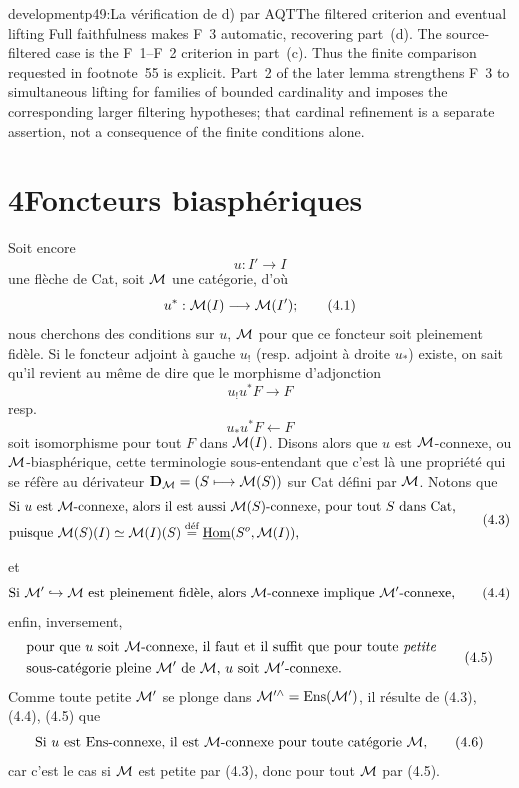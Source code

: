 \begin{dcomment}{development}{p49:La vérification de d) par AQT}{The filtered criterion and eventual lifting}
Full faithfulness makes F~3 automatic, recovering part~(d). The source-filtered case is the F~1--F~2 criterion in part~(c). Thus the finite comparison requested in footnote~55 is explicit. Part~2 of the later lemma strengthens F~3 to simultaneous lifting for families of bounded cardinality and imposes the corresponding larger filtering hypotheses; that cardinal refinement is a separate assertion, not a consequence of the finite conditions alone.
\end{dcomment}


\section*{4\quad Foncteurs biasphériques}

Soit encore
\[
u : I' \longrightarrow I
\]
une flèche de Cat, soit $\mathcal{M}$ une catégorie, d'où
\[
u^* : \cM(I) \longrightarrow \cM(I');
\tag*{(4.1)}
\]
nous cherchons des conditions sur $u$, $\mathcal{M}$ pour que ce foncteur soit pleinement fidèle. Si le foncteur adjoint à gauche $u_!$ (resp. adjoint à droite $u_*$) existe, on sait qu'il revient au même de dire que le morphisme d'adjonction
\[
u_!u^*F \longrightarrow F
\tag*{(4.2)}
\]
resp.
\[
u_*u^*F \longleftarrow F
\tag*{(4.2 bis)}
\]
soit isomorphisme pour tout $F$ dans $\mathcal{M}(I)$. Disons alors que $u$ est $\mathcal{M}$-connexe, ou $\mathcal{M}$-biasphérique, cette terminologie sous-entendant que c'est là une propriété qui se réfère au dérivateur $\mathbf{D}_{\mathcal{M}} = (S \longmapsto \mathcal{M}(S))$ sur Cat défini par $\mathcal{M}$. Notons que
\[
\begin{aligned}
&\text{Si $u$ est $\cM$-connexe, alors il est aussi $\cM(S)$-connexe, pour tout $S$ dans Cat,}\\
&\text{puisque $\cM(S)(I) \simeq \cM(I)(S) \defeq \uHom(S^o, \cM(I))$,}
\end{aligned}
\tag*{(4.3)}
\]

et
\[
\text{Si $\cM' \hookrightarrow \cM$ est pleinement fidèle, alors $\cM$-connexe implique $\cM'$-connexe,}
\tag*{(4.4)}
\]
enfin, inversement,
\[
\begin{aligned}
&\text{pour que $u$ soit $\cM$-connexe, il faut et il suffit que pour toute \textit{petite}}\\
&\text{sous-catégorie pleine $\cM'$ de $\cM$, $u$ soit $\cM'$-connexe.}
\end{aligned}
\tag*{(4.5)}
\]
Comme toute petite $\mathcal{M}'$ se plonge dans $\mathcal{M}'^\wedge = \operatorname{Ens}(\mathcal{M}')$, il résulte de (4.3), (4.4), (4.5) que
\[
\text{Si $u$ est Ens-connexe, il est $\cM$-connexe pour toute catégorie $\cM$,}
\tag*{(4.6)}
\]
car c'est le cas si $\mathcal{M}$ est petite par (4.3), donc pour tout $\mathcal{M}$ par (4.5).

